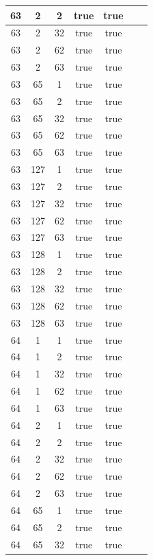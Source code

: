 \documentclass[a4paper,9pt,oneside]{scrreprt}
\begin{document}
\begin{enumerate}[a)]
\begin{paracol}{2}
\begin{table}[!htb]
\begin{minipage}{.5\linewidth}
{\begin{tabular}{|c|c|c|c|c|c|c|}
							\hline
							63&2&2&true&true\\
							\hline
							63&2&32&true&true\\
							\hline
							63&2&62&true&true\\
							\hline
							63&2&63&true&true\\
							\hline
							63&65&1&true&true\\
							\hline
							63&65&2&true&true\\
							\hline
							63&65&32&true&true\\
							\hline
							63&65&62&true&true\\
							\hline
							63&65&63&true&true\\
							\hline
							63&127&1&true&true\\
							\hline
							63&127&2&true&true\\
							\hline
							63&127&32&true&true\\
							\hline
							63&127&62&true&true\\
							\hline
							63&127&63&true&true\\
							\hline
							63&128&1&true&true\\
							\hline
							63&128&2&true&true\\
							\hline
							63&128&32&true&true\\
							\hline
							63&128&62&true&true\\
							\hline
							63&128&63&true&true\\
							\hline
							64&1&1&true&true\\
							\hline
							64&1&2&true&true\\
							\hline
							64&1&32&true&true\\
							\hline
							64&1&62&true&true\\
							\hline
							64&1&63&true&true\\
							\hline
							64&2&1&true&true\\
							\hline
							64&2&2&true&true\\
							\hline
							64&2&32&true&true\\
							\hline
							64&2&62&true&true\\
							\hline
							64&2&63&true&true\\
							\hline
							64&65&1&true&true\\
							\hline
							64&65&2&true&true\\
							\hline
							64&65&32&true&true\\

\end{tabular}}
\end{minipage}
\end{table}
\end{paracol}
\end{enumerate}
\end{document}

